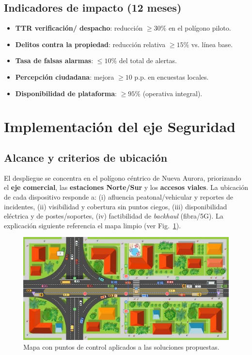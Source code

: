 \documentclass[12pt,a4paper]{article}
\begin{document}
\subsection*{Indicadores de impacto (12 meses)}
\begin{itemize}
  \item \textbf{TTR verificación/ despacho}: reducción \(\geq 30\%\) en el polígono piloto.
  \item \textbf{Delitos contra la propiedad}: reducción relativa \(\geq 15\%\) vs. línea base.
  \item \textbf{Tasa de falsas alarmas}: \(\leq 10\%\) del total de alertas.
  \item \textbf{Percepción ciudadana}: mejora \(\geq 10\) p.p. en encuestas locales.
  \item \textbf{Disponibilidad de plataforma}: \(\geq 95\%\) (operativa integral).
\end{itemize}

\newpage
\section{Implementación del eje Seguridad}
\label{sec:impl-seguridad}

\subsection{Alcance y criterios de ubicación}
El despliegue se concentra en el polígono céntrico de Nueva Aurora, priorizando el \textbf{eje comercial}, las \textbf{estaciones Norte/Sur} y los \textbf{accesos viales}. La ubicación de cada dispositivo responde a: (i) afluencia peatonal/vehicular y reportes de incidentes, (ii) visibilidad y cobertura sin puntos ciegos, (iii) disponibilidad eléctrica y de postes/soportes, (iv) factibilidad de \textit{backhaul} (fibra/5G). La explicación siguiente referencia el mapa limpio (ver Fig.~\ref{fig:mapa-nueva-aurora}).

\begin{figure}[htbp]
  \centering
  \includegraphics[width=\linewidth]{mapa-nueva-aurora.png}
  \caption{Mapa con puntos de control aplicados a las soluciones propuestas.}
  \label{fig:mapa-nueva-aurora}
\end{figure}
\end{document}
